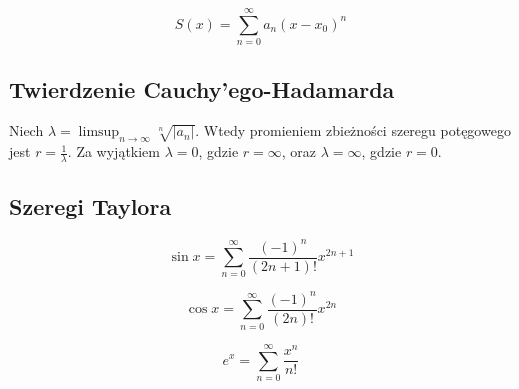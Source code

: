 \documentclass{../notatki}
\begin{document}
$$
S(x) = \sum_{n=0}^\infty a_n (x - x_0)^n
$$

\subsection{Twierdzenie Cauchy'ego-Hadamarda}

Niech $\lambda = \limsup_{n \to \infty} \sqrt[n]{|a_n|}$. Wtedy
promieniem zbieżności szeregu potęgowego jest $r =
\frac{1}{\lambda}$. Za wyjątkiem $\lambda = 0$, gdzie $r = \infty$,
oraz $\lambda = \infty$, gdzie $r = 0$.

\subsection{Szeregi Taylora}

$$
\sin x = \sum_{n=0}^\infty \frac{(-1)^n}{(2n+1)!} x^{2n+1}
$$

$$
\cos x = \sum_{n=0}^\infty \frac{(-1)^n}{(2n)!} x^{2n}
$$

$$
e^x = \sum_{n=0}^\infty \frac{x^n}{n!}
$$
\end{document}
